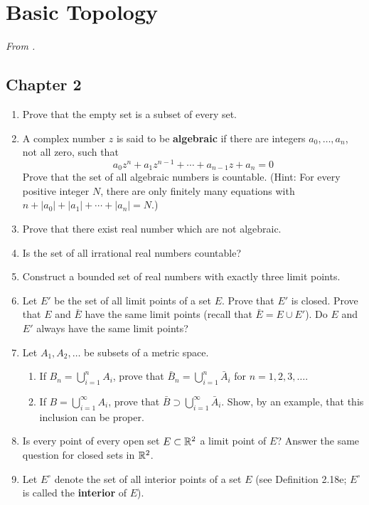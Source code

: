 \documentclass[../psets.tex]{subfiles}
\begin{document}
\section{Basic Topology}
\emph{From \textcite{bib:Rudin}.}
\subsection*{Chapter 2}
\begin{enumerate}[label={\textbf{\arabic*.}}]
    \item {}Prove that the empty set is a subset of every set.
    \item A complex number $z$ is said to be \textbf{algebraic} if there are integers $a_0,\dots,a_n$, not all zero, such that
    \begin{equation*}
        a_0z^n+a_1z^{n-1}+\cdots+a_{n-1}z+a_n = 0
    \end{equation*}
    Prove that the set of all algebraic numbers is countable. (Hint: For every positive integer $N$, there are only finitely many equations with $n+|a_0|+|a_1|+\cdots+|a_n|=N$.)
    \item Prove that there exist real number which are not algebraic.
    \item Is the set of all irrational real numbers countable?
    \item Construct a bounded set of real numbers with exactly three limit points.
    \item Let $E'$ be the set of all limit points of a set $E$. Prove that $E'$ is closed. Prove that $E$ and $\bar{E}$ have the same limit points (recall that $\bar{E}=E\cup E'$). Do $E$ and $E'$ always have the same limit points?
    \item Let $A_1,A_2,\dots$ be subsets of a metric space.
    \begin{enumerate}
        \item If $B_n=\bigcup_{i=1}^nA_i$, prove that $\bar{B}_n=\bigcup_{i=1}^n\bar{A}_i$ for $n=1,2,3,\dots$.
        \item If $B=\bigcup_{i=1}^\infty A_i$, prove that $\bar{B}\supset\bigcup_{i=1}^\infty\bar{A}_i$. Show, by an example, that this inclusion can be proper.
    \end{enumerate}
    \item Is every point of every open set $E\subset\mathbb{R}^2$ a limit point of $E$? Answer the same question for closed sets in $\mathbb{R}^2$.
    \item Let $E^\circ$ denote the set of all interior points of a set $E$ (see Definition 2.18e; $E^\circ$ is called the \textbf{interior} of $E$).

\end{enumerate}
\end{document}
